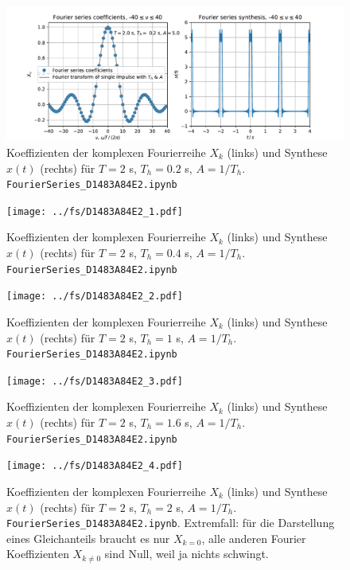 \begin{figure}
\includegraphics[width=\textwidth]{../fs/D1483A84E2_0.pdf}
\caption{Koeffizienten der komplexen Fourierreihe $X_k$ (links) und Synthese $x(t)$ (rechts) für
$T=2$ s, $T_h=0.2$ s, $A=1/T_h$. \texttt{FourierSeries\_D1483A84E2.ipynb}}
\label{fig:D1483A84E2_0}
\end{figure}

\begin{figure}
\texttt{[image: ../fs/D1483A84E2\_1.pdf]}
\caption{Koeffizienten der komplexen Fourierreihe $X_k$ (links) und Synthese $x(t)$ (rechts) für
$T=2$ s, $T_h=0.4$ s, $A=1/T_h$. \texttt{FourierSeries\_D1483A84E2.ipynb}}
\label{fig:D1483A84E2_1}
\end{figure}

\begin{figure}
\texttt{[image: ../fs/D1483A84E2\_2.pdf]}
\caption{Koeffizienten der komplexen Fourierreihe $X_k$ (links) und Synthese $x(t)$ (rechts) für
$T=2$ s, $T_h=1$ s, $A=1/T_h$. \texttt{FourierSeries\_D1483A84E2.ipynb}}
\label{fig:D1483A84E2_2}
\end{figure}

\begin{figure}
\texttt{[image: ../fs/D1483A84E2\_3.pdf]}
\caption{Koeffizienten der komplexen Fourierreihe $X_k$ (links) und Synthese $x(t)$ (rechts) für
$T=2$ s, $T_h=1.6$ s, $A=1/T_h$. \texttt{FourierSeries\_D1483A84E2.ipynb}}
\label{fig:D1483A84E2_3}
\end{figure}

\begin{figure}
\texttt{[image: ../fs/D1483A84E2\_4.pdf]}
\caption{Koeffizienten der komplexen Fourierreihe $X_k$ (links) und Synthese $x(t)$ (rechts) für
$T=2$ s, $T_h=2$ s, $A=1/T_h$. \texttt{FourierSeries\_D1483A84E2.ipynb}. Extremfall: für die
Darstellung eines Gleichanteils braucht es nur $X_{k=0}$, alle anderen Fourier Koeffizienten
$X_{k \neq 0}$ sind Null, weil ja nichts schwingt.}
\label{fig:D1483A84E2_4}
\end{figure}




